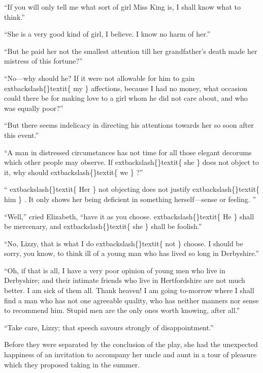 \documentclass[10pt]{book}
\begin{document}
   “If you will only tell me what sort of girl Miss King is, I shall know
what to think.”
  

   “She is a very good kind of girl, I believe. I know no harm of her.”
  

   “But he paid her not the smallest attention till her grandfather’s death
made her mistress of this fortune?”
  

   “No—why should he? If it were not allowable for him to gain
   	extbackslash\{\}textit\{
    my
   \}
   affections, because I had no money, what occasion could there be for
making love to a girl whom he did not care about, and who was equally
poor?”
  

   “But there seems indelicacy in directing his attentions towards her so
soon after this event.”
  

   “A man in distressed circumstances has not time for all those elegant
decorums which other people may observe. If
   	extbackslash\{\}textit\{
    she
   \}
   does not object to it,
why should
   	extbackslash\{\}textit\{
    we
   \}
   ?”
  

   “
   	extbackslash\{\}textit\{
    Her
   \}
   not objecting does not justify
   	extbackslash\{\}textit\{
    him
   \}
   . It only shows her being
deficient in something herself—sense or feeling.
   ”
  

   “Well,” cried Elizabeth, “have it as you choose.
   	extbackslash\{\}textit\{
    He
   \}
   shall be
mercenary, and
   	extbackslash\{\}textit\{
    she
   \}
   shall be foolish.”
  

   “No, Lizzy, that is what I do
   	extbackslash\{\}textit\{
    not
   \}
   choose. I should be sorry, you know,
to think ill of a young man who has lived so long in Derbyshire.”
  

   “Oh, if that is all, I have a very poor opinion of young men who live in
Derbyshire; and their intimate friends who live in Hertfordshire are not
much better. I am sick of them all. Thank heaven! I am going to-morrow
where I shall find a man who has not one agreeable quality, who has
neither manners nor sense to recommend him. Stupid men are the only ones
worth knowing, after all.”
  

   “Take care, Lizzy; that speech savours strongly of disappointment.”
  

   Before they were separated by the conclusion of the play, she had the
unexpected happiness of an invitation to accompany her uncle and aunt in
a tour of pleasure which they proposed taking in the summer.
  
\end{document}
